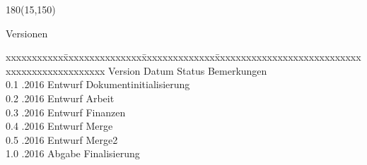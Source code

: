 
\begin{textblock}{180}(15,150)
\color{black}
\begin{huge}
Versionen
\end{huge}
\vspace{10mm}

\fontsize{10pt}{18pt}\selectfont
\begin{tabbing}
xxxxxxxxxxx\=xxxxxxxxxxxxxxx\=xxxxxxxxxxxxxx\=xxxxxxxxxxxxxxxxxxxxxxxxxxxxxxxxxxxxxxxxxxxxxxx \kill
Version	\> Datum	\> Status		\> Bemerkungen		\\
0.1	.2016	\> Entwurf		\> Dokumentinitialisierung	\\	
0.2	.2016	\> Entwurf		\> Arbeit	\\	
0.3	.2016	\> Entwurf		\> Finanzen	\\
0.4	.2016	\> Entwurf		\> Merge	\\
0.5	.2016	\> Entwurf		\> Merge2	\\
1.0	.2016	\> Abgabe		\> Finalisierung	\\
\end{tabbing}

\end{textblock}
